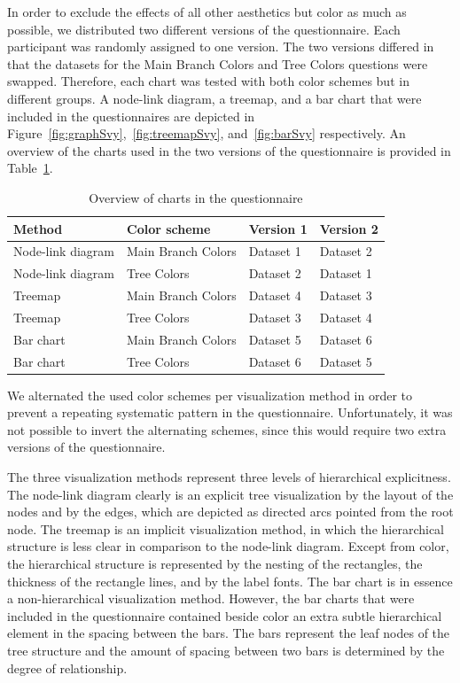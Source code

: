 \documentclass[journal]{vgtc}                %
\begin{document}
In order to exclude the effects of all other aesthetics but color as much as possible, we distributed two different versions of the questionnaire. Each participant was randomly assigned to one version. The two versions differed in that the datasets for the Main Branch Colors and Tree Colors questions were swapped. Therefore, each chart was tested with both color schemes but in different groups. A node-link diagram, a treemap, and a bar chart that were included in the questionnaires are depicted in Figure~\ref{fig:graphSvy},~\ref{fig:treemapSvy}, and~\ref{fig:barSvy} respectively. An overview of the charts used in the two versions of the questionnaire is provided in Table~\ref{table:ques}.

\begin{table}[!htb]
\begin{footnotesize}
\begin{center}
\begin{tabular}{llll}
\toprule
Method & Color scheme & Version 1 & Version 2\\
\midrule
Node-link diagram & Main Branch Colors & Dataset 1 & Dataset 2\\
Node-link diagram & Tree Colors & Dataset 2 & Dataset 1\\
Treemap & Main Branch Colors & Dataset 4 & Dataset 3\\
Treemap & Tree Colors & Dataset 3 & Dataset 4\\
Bar chart & Main Branch Colors & Dataset 5 & Dataset 6\\
Bar chart & Tree Colors & Dataset 6 & Dataset 5\\
\bottomrule
\end{tabular}
\end{center}
\end{footnotesize}
\caption{Overview of charts in the questionnaire}\label{table:ques}
\end{table}

We alternated the used color schemes per visualization method in order to prevent a repeating systematic pattern in the questionnaire. Unfortunately, it was not possible to invert the alternating schemes, since this would require two extra versions of the questionnaire. 

The three visualization methods represent three levels of hierarchical explicitness. The node-link diagram clearly is an explicit tree visualization by the layout of the nodes and by the edges, which are depicted as directed arcs pointed from the root node. The treemap is an implicit visualization method, in which the hierarchical structure is less clear in comparison to the node-link diagram. Except from color, the hierarchical structure is represented by the nesting of the rectangles, the thickness of the rectangle lines, and by the label fonts. The bar chart is in essence a non-hierarchical visualization method. However, the bar charts that were included in the questionnaire contained beside color an extra subtle hierarchical element in the spacing between the bars. The bars represent the leaf nodes of the tree structure and the amount of spacing between two bars is determined by the degree of relationship.
\end{document}
